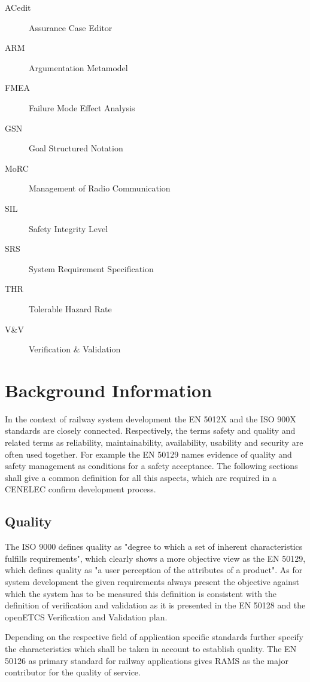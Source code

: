 \documentclass{template/openetcs_report}
\begin{document}
\begin{description}

\item [ACedit] Assurance Case Editor
\item [ARM] Argumentation  Metamodel
\item[FMEA] Failure Mode Effect Analysis
\item[GSN] Goal Structured Notation
\item[MoRC] Management of Radio Communication
\item[SIL] Safety Integrity Level
\item[SRS] System Requirement Specification
\item[THR] Tolerable Hazard Rate
\item[V\&V] Verification \& Validation

\end{description}

\section{Background Information}
\label{sec:Background}

In the context of railway system development the EN 5012X and the ISO 900X standards are closely connected. Respectively, the terms safety and quality and related terms as reliability, maintainability, availability, usability and security are often used together. For example the EN 50129 names evidence of quality and safety management as conditions for a safety acceptance. The following sections shall give a common definition for all this aspects, which are required in a CENELEC confirm development process. 

\subsection{Quality}

The ISO 9000 defines quality as "degree to which a set of inherent characteristics fulfills requirements", which clearly shows a more objective view as the EN 50129, which defines quality as "a user perception of the attributes of a product". As for system development the given requirements always present the objective against which the system has to be measured this definition is consistent with the definition of verification and validation as it is presented in the EN 50128 and the openETCS Verification and Validation plan.

Depending on the respective field of application specific standards further specify the characteristics which shall be taken in account to establish quality. The EN 50126 as primary standard for railway applications gives RAMS as the major contributor for the quality of service. 
\end{document}
